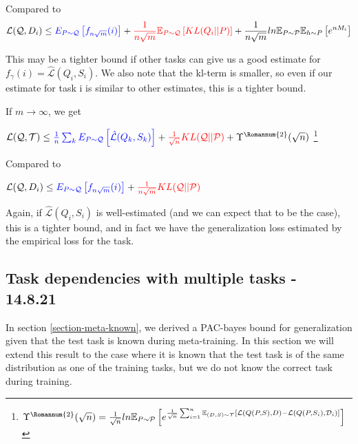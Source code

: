 \documentclass[letterpaper]{article}
\theoremstyle{definition}
\begin{document}
Compared to 
\begin{equation*}
\begin{split}
\mathcal{L}(\mathcal{Q}, D_i)\leq \textcolor{blue}{E_{P\sim \mathcal{Q}}  \left [ f_{n\sqrt{m}}(i) \right ]}  + \textcolor{red}{\frac{1}{n\sqrt{m}}\mathbb{E}_{P\sim \mathcal{Q}} \left [KL(Q_i||P)\right ]} + \frac{1}{n\sqrt{m}} ln\mathbb{E}_{P\sim \mathcal{P}}\mathbb{E}_{h\sim P}\left [ e^{nM_i}\right ]  
\end{split}
\end{equation*}
 
This may be a tighter bound if other tasks can give us a good estimate for $f_{\gamma}(i)=\hat{\mathcal{L}}(Q_i,S_i)$. We also note that the kl-term is smaller, so even if our estimate for task i is similar to other estimates, this is a tighter bound.

If $m\rightarrow\infty$, we get

$\mathcal{L}(\mathcal{Q}, \mathcal{T}) \leq \textcolor{blue}{\frac{1}{n}\sum_k E_{P\sim \mathcal{Q}} \left [ \hat{\mathcal{L}}(Q_k,S_k) \right ]}+ \textcolor{red}{\frac{1}{\sqrt{n}}KL(\mathcal{Q}||\mathcal{P})} + \Upsilon^{\text{\Romannum{2}}}(\sqrt{n})$ 
\footnote{$\Upsilon^{\text{\Romannum{2}}}(\sqrt{n})=\frac{1}{\sqrt{n}}ln \mathbb{E}_{P\sim \mathcal{P}} \left [e^{\frac{1}{\sqrt{n}}\sum_{i=1}^{n}\mathbb{E}_{(D,S)\sim \mathcal{T}}\left [\mathcal{L}(Q(P,S),D)- \mathcal{L}(Q(P, S_i), \mathcal{D}_i)\right ]} \right ]$}

Compared to 

$\mathcal{L}(\mathcal{Q}, D_i)\leq \textcolor{blue}{E_{P\sim \mathcal{Q}}  \left [ f_{n\sqrt{m}}(i)\right ]} + \textcolor{red}{\frac{1}{n\sqrt{m}}KL(\mathcal{Q}||\mathcal{P})} $

Again, if $\hat{\mathcal{L}}(Q_i,S_i)$ is well-estimated (and we can expect that to be the case), this is a tighter bound, and in fact we have the generalization loss estimated by the empirical loss for the task.


\subsection{Task dependencies with multiple tasks - 14.8.21}

In section \ref{section-meta-known}, we derived a PAC-bayes bound for generalization given that the test task is known during meta-training. In this section we will extend this result to the case where it is known that the test task is of the same distribution as one of the training tasks, but we do not know the correct task during training.
\end{document}
